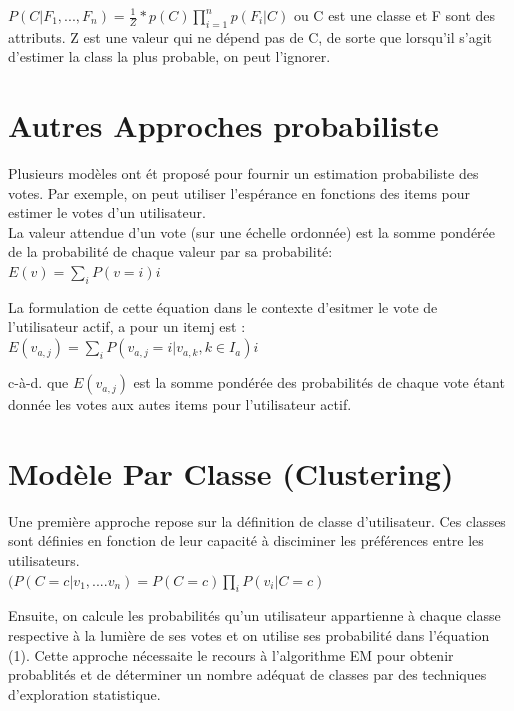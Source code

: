 \documentclass[oneside]{book}
\begin{document}
\centering
$P(C|F_1,...,F_n) = \frac{1}{Z} * p(C) \prod\limits_{i=1}^n p(F_i|C)$
\justify
ou C est une classe et F sont des attributs. Z est une valeur qui ne dépend pas de C, de sorte que lorsqu'il s'agit d'estimer la class la plus probable, on peut l'ignorer.\\

\section{Autres Approches probabiliste}
Plusieurs modèles ont ét proposé pour fournir un estimation probabiliste des votes. Par exemple, on peut utiliser l'espérance en fonctions des items pour estimer le votes d'un utilisateur. \\

La valeur attendue d'un vote (sur une échelle ordonnée) est la somme pondérée de la probabilité de chaque valeur par sa probabilité:\\

\centering
$E(v) = \sum\limits_i P(v=i)i$
\justify

La formulation de cette équation dans le contexte d'esitmer le vote de l'utilisateur actif, a pour un itemj est :\\

\centering
$E(v_{a,j}) = \sum\limits_i P(v_{a,j} = i|v_{a,k},k \in I_a)i$
\justify

c-à-d. que $E(v_{a,j})$ est la somme pondérée des probabilités de chaque vote étant donnée les votes aux autes items pour l'utilisateur actif. 

\section{Modèle Par Classe (Clustering)}
Une première approche repose sur la définition de classe d'utilisateur. Ces classes sont définies en fonction de leur capacité à disciminer les préférences entre les utilisateurs.\\

\centering
$(P(C=c|v_1,....v_n) = P(C=c)\prod_i P(v_i|C=c)$\\
\justify

Ensuite, on calcule les probabilités qu'un utilisateur appartienne à chaque classe respective à la lumière de ses votes et on utilise ses probabilité dans l'équation (1). Cette approche nécessaite le recours à l'algorithme EM pour obtenir probablités et de déterminer un nombre adéquat de classes par des techniques d'exploration statistique. \\
\end{document}
